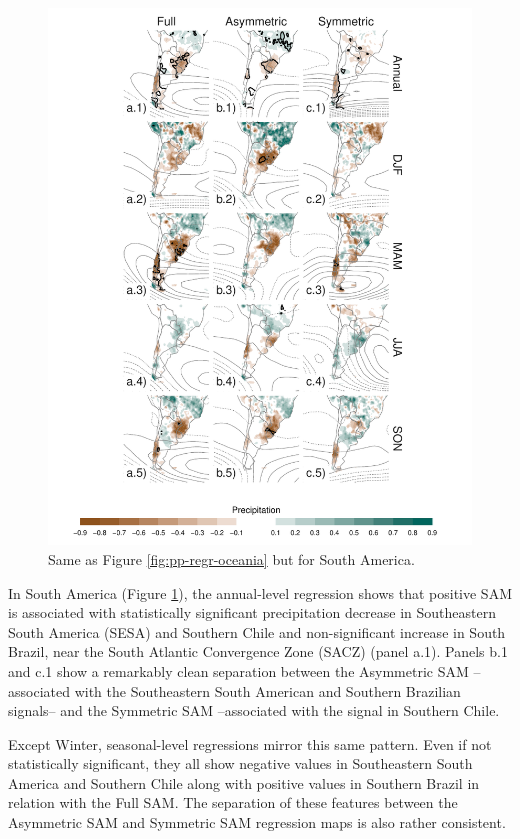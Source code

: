 \documentclass[]{ametsocV5}
\begin{document}
\begin{figure}
\includegraphics{pp-regr-america-1} \caption{Same as Figure \ref{fig:pp-regr-oceania} but for South America.}\label{fig:pp-regr-america}
\end{figure}

In South America (Figure \ref{fig:pp-regr-america}), the annual-level
regression shows that positive SAM is associated with statistically
significant precipitation decrease in Southeastern South America (SESA)
and Southern Chile and non-significant increase in South Brazil, near
the South Atlantic Convergence Zone (SACZ) (panel a.1). Panels b.1 and
c.1 show a remarkably clean separation between the Asymmetric SAM
--associated with the Southeastern South American and Southern Brazilian
signals-- and the Symmetric SAM --associated with the signal in Southern
Chile.

Except Winter, seasonal-level regressions mirror this same pattern. Even
if not statistically significant, they all show negative values in
Southeastern South America and Southern Chile along with positive values
in Southern Brazil in relation with the Full SAM. The separation of
these features between the Asymmetric SAM and Symmetric SAM regression
maps is also rather consistent.
\end{document}
